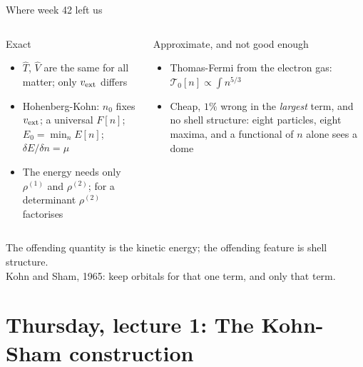 \documentclass[aspectratio=169,10pt]{beamer}
\begin{document}
\begin{frame}{Where week 42 left us}
  \begin{columns}[T]
    \begin{block}{Exact}
      \begin{itemize}
        \item $\hat T$, $\hat V$ are the same for all matter; only $v_{\rm ext}$ differs
        \item Hohenberg-Kohn: $n_0$ fixes $v_{\rm ext}$; a universal $F[n]$; $E_0=\min_nE[n]$; $\delta E/\delta n=\mu$
        \item The energy needs only $\rho^{(1)}$ and $\rho^{(2)}$; for a determinant $\rho^{(2)}$ factorises
      \end{itemize}
    \end{block}
    \begin{block}{Approximate, and not good enough}
      \begin{itemize}
        \item Thomas-Fermi from the electron gas: $\mathcal T_0[n]\propto\int n^{5/3}$
        \item Cheap, $1\%$ wrong in the \emph{largest} term, and \alert{no shell structure}: eight particles, eight maxima, and a functional of $n$ alone sees a dome
      \end{itemize}
    \end{block}
  \end{columns}
  \vspace{0.6em}
  \centering The offending quantity is the kinetic energy; the offending feature is shell structure.\\[0.3em]
  \alert{Kohn and Sham, 1965: keep orbitals for that one term, and only that term.}
\end{frame}

\section{Thursday, lecture 1: The Kohn-Sham construction}
\end{document}
